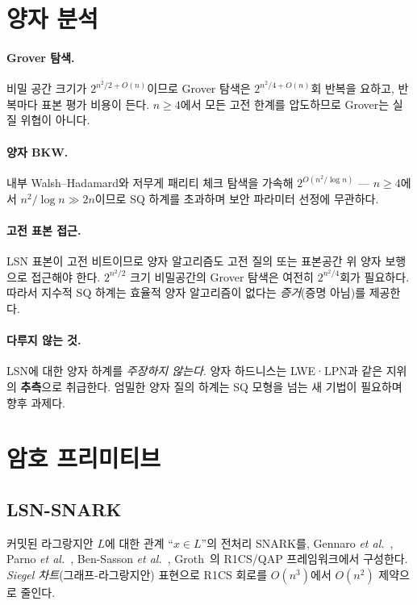 \documentclass[11pt,a4paper]{article}
\theoremstyle{plain}
\theoremstyle{definition}
\newcommand{\etal}{\textit{et al.}}
\begin{document}
\section{양자 분석}

\paragraph{Grover 탐색.} 비밀 공간 크기가 $2^{n^2/2+O(n)}$이므로 Grover 탐색은 $2^{n^2/4+O(n)}$회 반복을 요하고, 반복마다 표본 평가 비용이 든다. $n \ge 4$에서 모든 고전 한계를 압도하므로 Grover는 실질 위협이 아니다.

\paragraph{양자 BKW.} 내부 Walsh--Hadamard와 저무게 패리티 체크 탐색을 가속해 $2^{O(n^2/\log n)}$ --- $n \ge 4$에서 $n^2/\log n \gg 2n$이므로 SQ 하계를 초과하며 보안 파라미터 선정에 무관하다.

\paragraph{고전 표본 접근.} LSN 표본이 고전 비트이므로 양자 알고리즘도 고전 질의 또는 표본공간 위 양자 보행으로 접근해야 한다. $2^{n^2/2}$ 크기 비밀공간의 Grover 탐색은 여전히 $2^{n^2/4}$회가 필요하다. 따라서 지수적 SQ 하계는 효율적 양자 알고리즘이 없다는 \emph{증거}(증명 아님)를 제공한다.

\paragraph{다루지 않는 것.} LSN에 대한 양자 하계를 \emph{주장하지 않는다}. 양자 하드니스는 LWE·LPN과 같은 지위의 \textbf{추측}으로 취급한다. 엄밀한 양자 질의 하계는 SQ 모형을 넘는 새 기법이 필요하며 향후 과제다.


\section{암호 프리미티브}
\label{sec:primitives-ko}

\subsection{LSN-SNARK}

커밋된 라그랑지안 $L$에 대한 관계 ``$x \in L$''의 전처리 SNARK를, Gennaro \etal~\cite{GGPR13}, Parno \etal~\cite{PHGR13}, Ben-Sasson \etal~\cite{BCTV14}, Groth~\cite{Gro16}의 R1CS/QAP 프레임워크에서 구성한다. \emph{Siegel 차트}(그래프-라그랑지안) 표현으로 R1CS 회로를 $O(n^3)$에서 $O(n^2)$ 제약으로 줄인다.
\end{document}
